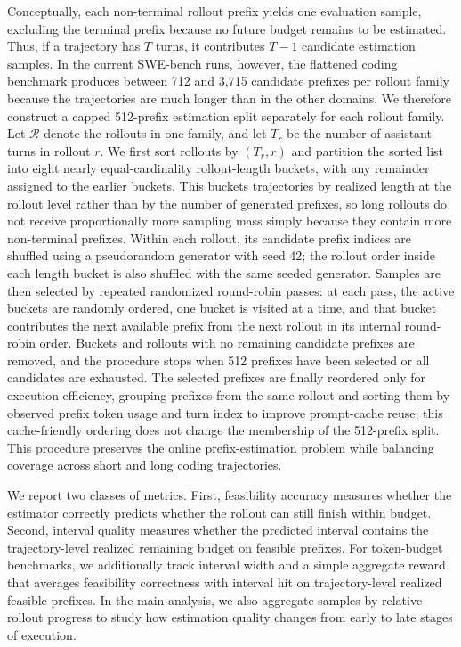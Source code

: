 Conceptually, each non-terminal rollout prefix yields one evaluation sample, excluding the terminal prefix because no future budget remains to be estimated. Thus, if a trajectory has $T$ turns, it contributes $T-1$ candidate estimation samples. In the current SWE-bench runs, however, the flattened coding benchmark produces between 712 and 3{,}715 candidate prefixes per rollout family because the trajectories are much longer than in the other domains. We therefore construct a capped 512-prefix estimation split separately for each rollout family. Let $\mathcal{R}$ denote the rollouts in one family, and let $T_r$ be the number of assistant turns in rollout $r$. We first sort rollouts by $(T_r,r)$ and partition the sorted list into eight nearly equal-cardinality rollout-length buckets, with any remainder assigned to the earlier buckets. This buckets trajectories by realized length at the rollout level rather than by the number of generated prefixes, so long rollouts do not receive proportionally more sampling mass simply because they contain more non-terminal prefixes. Within each rollout, its candidate prefix indices are shuffled using a pseudorandom generator with seed 42; the rollout order inside each length bucket is also shuffled with the same seeded generator. Samples are then selected by repeated randomized round-robin passes: at each pass, the active buckets are randomly ordered, one bucket is visited at a time, and that bucket contributes the next available prefix from the next rollout in its internal round-robin order. Buckets and rollouts with no remaining candidate prefixes are removed, and the procedure stops when 512 prefixes have been selected or all candidates are exhausted. The selected prefixes are finally reordered only for execution efficiency, grouping prefixes from the same rollout and sorting them by observed prefix token usage and turn index to improve prompt-cache reuse; this cache-friendly ordering does not change the membership of the 512-prefix split. This procedure preserves the online prefix-estimation problem while balancing coverage across short and long coding trajectories.

We report two classes of metrics. First, feasibility accuracy measures whether the estimator correctly predicts whether the rollout can still finish within budget. Second, interval quality measures whether the predicted interval contains the trajectory-level realized remaining budget on feasible prefixes. For token-budget benchmarks, we additionally track interval width and a simple aggregate reward that averages feasibility correctness with interval hit on trajectory-level realized feasible prefixes. In the main analysis, we also aggregate samples by relative rollout progress to study how estimation quality changes from early to late stages of execution.

